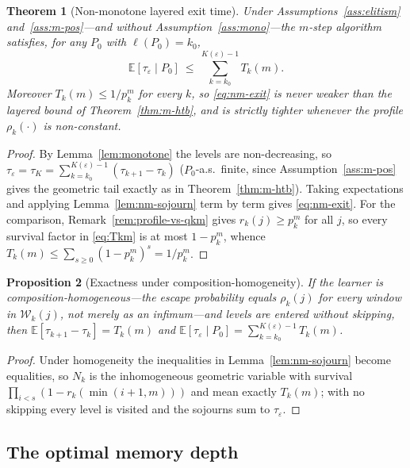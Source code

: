 \documentclass[11pt,a4paper]{article}
\newtheorem{theorem}{Theorem}[section]
\newtheorem{proposition}[theorem]{Proposition}
\newcommand{\E}{\mathbb{E}}
\begin{document}
\begin{theorem}[Non-monotone layered exit time]\label{thm:nm-exit}
  Under Assumptions~\ref{ass:elitism} and~\ref{ass:m-pos}---and
  \emph{without} Assumption~\ref{ass:mono}---the $m$-step algorithm
  satisfies, for any $P_0$ with $\ell(P_0)=k_0$,
  \begin{equation}
    \E[\tau_\varepsilon\mid P_0]\ \le\ \sum_{k=k_0}^{K(\varepsilon)-1} T_k(m).
    \label{eq:nm-exit}
  \end{equation}
  Moreover $T_k(m)\le 1/p_k^m$ for every $k$, so \eqref{eq:nm-exit} is
  never weaker than the layered bound of Theorem~\ref{thm:m-htb}, and is
  strictly tighter whenever the profile $\rho_k(\cdot)$ is non-constant.
\end{theorem}

\begin{proof}
  By Lemma~\ref{lem:monotone} the levels are non-decreasing, so
  $\tau_\varepsilon=\tau_K=\sum_{k=k_0}^{K(\varepsilon)-1}(\tau_{k+1}-\tau_k)$
  ($P_0$-a.s.\ finite, since Assumption~\ref{ass:m-pos} gives the geometric
  tail exactly as in Theorem~\ref{thm:m-htb}).  Taking expectations and
  applying Lemma~\ref{lem:nm-sojourn} term by term gives \eqref{eq:nm-exit}.
  For the comparison, Remark~\ref{rem:profile-vs-qkm} gives $r_k(j)\ge
  p_k^m$ for all $j$, so every survival factor in \eqref{eq:Tkm} is at
  most $1-p_k^m$, whence $T_k(m)\le\sum_{s\ge0}(1-p_k^m)^s=1/p_k^m$.
\end{proof}

\begin{proposition}[Exactness under composition-homogeneity]
\label{prop:nm-exact}
  If the learner is \emph{composition-homogeneous}---the escape
  probability equals $\rho_k(j)$ for every window in $\mathcal W_k(j)$,
  not merely as an infimum---and levels are entered without skipping,
  then $\E[\tau_{k+1}-\tau_k]=T_k(m)$ and
  $\E[\tau_\varepsilon\mid P_0]=\sum_{k=k_0}^{K(\varepsilon)-1}T_k(m)$.
\end{proposition}

\begin{proof}
  Under homogeneity the inequalities in Lemma~\ref{lem:nm-sojourn} become
  equalities, so $N_k$ is the inhomogeneous geometric variable with
  survival $\prod_{i<s}(1-r_k(\min(i+1,m)))$ and mean exactly $T_k(m)$;
  with no skipping every level is visited and the sojourns sum to
  $\tau_\varepsilon$.
\end{proof}

\subsection{The optimal memory depth}
\label{sec:nm-optdepth}
\end{document}
